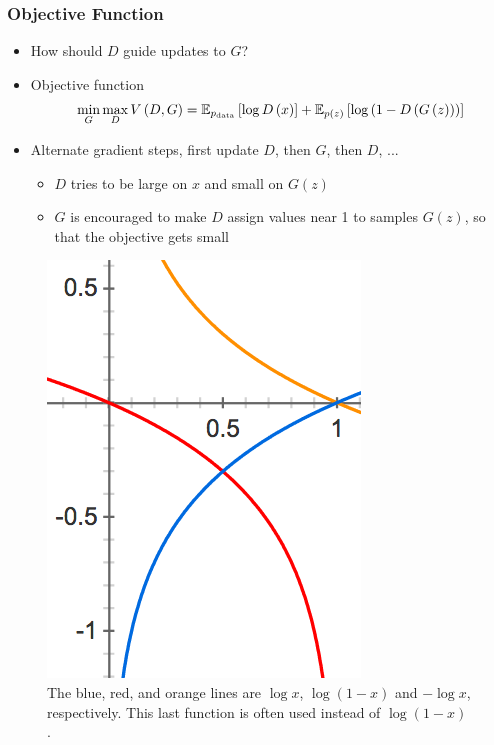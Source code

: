 \documentclass[10pt,mathserif]{beamer}
\begin{document}
\begin{frame}
\frametitle{Objective Function}
 \begin{itemize}
   \item How should $D$ guide updates to $G$?
   \item Objective function
     \begin{align*}
       \min_{G}\max_{D} V\left(D, G\right) = \mathbb{E}_{p_{\text{data}}}\left[{\log D\left(x\right)}\right] + \mathbb{E}_{p\left(z\right)}\left[{\log\left(1 - D\left(G\left(z\right)\right)\right)}\right]
     \end{align*}
   \item Alternate gradient steps, first update $D$, then $G$, then $D$, ...
\begin{itemize}
\item $D$ tries to be large on $x$ and small on $G\left(z\right)$
\item $G$ is encouraged to make $D$ assign values near 1 to samples
  $G\left(z\right)$, so that the objective gets small
\end{itemize}
 \end{itemize}
\begin{figure}[ht]
  \centering
  \includegraphics[width=0.17\paperwidth]{figure/gan_objectives}
  \caption{The blue, red, and orange lines are $\log x$, $\log\left(1 -
    x\right)$ and $-\log x$, respectively. This last function is often used
    instead of $\log \left(1 - x\right)$. \label{fig:gan_objectives} }
\end{figure}
\end{frame}
\end{document}
